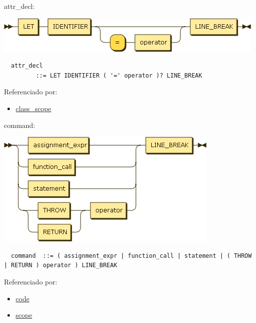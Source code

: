 \begin{minipage}{\textwidth}
  \protect\hypertarget{attr_decl}{}{attr\_decl:}

  \includegraphics[width=5.20833in,height=0.70833in]{diagram/attr_decl.png}

  \begin{verbatim}
  attr_decl
         ::= LET IDENTIFIER ( '=' operator )? LINE_BREAK
  \end{verbatim}

  Referenciado por:

  \begin{itemize}
      \tightlist%
    \item
      \protect\hyperlink{class_scope}{class\_scope}
  \end{itemize}

\end{minipage}

\begin{minipage}{\textwidth}
  \protect\hypertarget{command}{}{command:}

  \includegraphics[width=4.27083in,height=2.20833in]{diagram/command.png}

  \begin{verbatim}
  command  ::= ( assignment_expr | function_call | statement | ( THROW | RETURN ) operator ) LINE_BREAK
  \end{verbatim}

  Referenciado por:

  \begin{itemize}
      \tightlist%
    \item
      \protect\hyperlink{code}{code}
    \item
      \protect\hyperlink{scope}{scope}
  \end{itemize}

\end{minipage}

